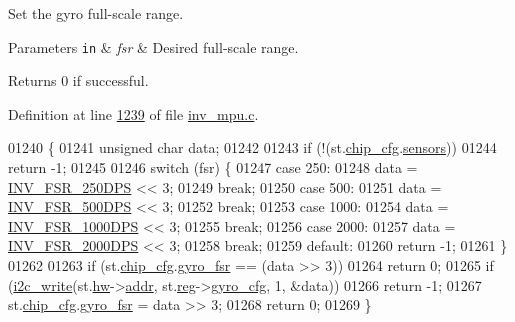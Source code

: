 Set the gyro full-\/scale range. 


\begin{DoxyParams}[1]{Parameters}
\mbox{\tt in}  & {\em fsr} & Desired full-\/scale range. \\
\hline
\end{DoxyParams}
\begin{DoxyReturn}{Returns}
0 if successful. 
\end{DoxyReturn}


Definition at line \hyperlink{inv__mpu_8c_source_l01239}{1239} of file \hyperlink{inv__mpu_8c_source}{inv\+\_\+mpu.\+c}.


\begin{DoxyCode}
01240 \{
01241     \textcolor{keywordtype}{unsigned} \textcolor{keywordtype}{char} data;
01242 
01243     \textcolor{keywordflow}{if} (!(st.\hyperlink{structgyro__state__s_ac895217592e2084bd520b0be8e9d20ee}{chip\_cfg}.\hyperlink{structchip__cfg__s_aaa21c01566947e7007476657cb614e3f}{sensors}))
01244         \textcolor{keywordflow}{return} -1;
01245 
01246     \textcolor{keywordflow}{switch} (fsr) \{
01247     \textcolor{keywordflow}{case} 250:
01248         data = \hyperlink{inv__mpu_8c_a83acdc0eb37e8bfe0c2ae2348ded0a90a5b8251a49db5cb8a676076b0b308ae35}{INV\_FSR\_250DPS} << 3;
01249         \textcolor{keywordflow}{break};
01250     \textcolor{keywordflow}{case} 500:
01251         data = \hyperlink{inv__mpu_8c_a83acdc0eb37e8bfe0c2ae2348ded0a90a50901470ff389927fd010081e2b8fd09}{INV\_FSR\_500DPS} << 3;
01252         \textcolor{keywordflow}{break};
01253     \textcolor{keywordflow}{case} 1000:
01254         data = \hyperlink{inv__mpu_8c_a83acdc0eb37e8bfe0c2ae2348ded0a90aee922e0daa4fbb404c3db6c49d897a13}{INV\_FSR\_1000DPS} << 3;
01255         \textcolor{keywordflow}{break};
01256     \textcolor{keywordflow}{case} 2000:
01257         data = \hyperlink{inv__mpu_8c_a83acdc0eb37e8bfe0c2ae2348ded0a90ac0c37efc1c8acd6f70c0c5a768e5b8be}{INV\_FSR\_2000DPS} << 3;
01258         \textcolor{keywordflow}{break};
01259     \textcolor{keywordflow}{default}:
01260         \textcolor{keywordflow}{return} -1;
01261     \}
01262 
01263     \textcolor{keywordflow}{if} (st.\hyperlink{structgyro__state__s_ac895217592e2084bd520b0be8e9d20ee}{chip\_cfg}.\hyperlink{structchip__cfg__s_abae9129fae33706b5f73b2b1867fcc89}{gyro\_fsr} == (data >> 3))
01264         \textcolor{keywordflow}{return} 0;
01265     \textcolor{keywordflow}{if} (\hyperlink{_i2_c_8c_ac0f145afe8d662af199043939f4398d6}{i2c\_write}(st.\hyperlink{structgyro__state__s_a5bac30a96752691e4cc723735060e360}{hw}->\hyperlink{structhw__s_a4c34a946600e9d68b6355d23f54d291b}{addr}, st.\hyperlink{structgyro__state__s_ae857e1285c583b7438a208edd691a38e}{reg}->\hyperlink{structgyro__reg__s_ac2b87a25876eb44862043cd56d33d49b}{gyro\_cfg}, 1, &data))
01266         \textcolor{keywordflow}{return} -1;
01267     st.\hyperlink{structgyro__state__s_ac895217592e2084bd520b0be8e9d20ee}{chip\_cfg}.\hyperlink{structchip__cfg__s_abae9129fae33706b5f73b2b1867fcc89}{gyro\_fsr} = data >> 3;
01268     \textcolor{keywordflow}{return} 0;
01269 \}
\end{DoxyCode}
